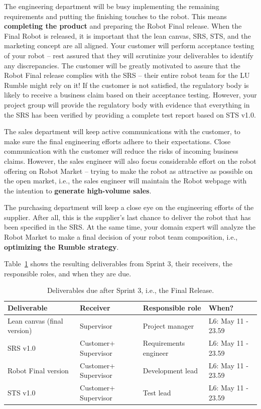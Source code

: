 \documentclass{scrreprt}
\begin{document}
The engineering department will be busy implementing the remaining requirements and putting the finishing touches to the robot. This means \textbf{completing the product} and preparing the Robot Final release. When the Final Robot is released, it is important that the lean canvas, SRS, STS, and the marketing concept are all aligned. Your customer will perform acceptance testing of your robot -- rest assured that they will scrutinize your deliverables to identify any discrepancies. The customer will be greatly motivated to assure that the Robot Final release complies with the SRS -- their entire robot team for the LU Rumble might rely on it! If the customer is not satisfied, the regulatory body is likely to receive a business claim based on their acceptance testing. However, your project group will provide the regulatory body with evidence that everything in the SRS has been verified by providing a complete test report based on STS v1.0.
 
The sales department will keep active communications with the customer, to make sure the final engineering efforts adhere to their expectations. Close communication with the customer will reduce the risks of incoming business claims. However, the sales engineer will also focus considerable effort on the robot offering on Robot Market -- trying to make the robot as attractive as possible on the open market, i.e., the sales engineer will maintain the Robot webpage with the intention to \textbf{generate high-volume sales}.

The purchasing department will keep a close eye on the engineering efforts of the supplier. After all, this is the supplier's last chance to deliver the robot that has been specified in the SRS. At the same time, your domain expert will analyze the Robot Market to make a final decision of your robot team composition, i.e., \textbf{optimizing the Rumble strategy}. 

Table~\ref{tab:sprint3} shows the resulting deliverables from Sprint 3, their receivers, the responsible roles, and when they are due.

\begin{table}[]
\centering
\caption{Deliverables due after Sprint 3, i.e., the Final Release.}
\label{tab:sprint3}
\begin{tabular}{|p{4cm}|p{2cm}|p{2.5cm}|p{4.5cm}|}
\hline
\textbf{Deliverable}           & \textbf{Receiver}   & \textbf{Responsible role} & \textbf{When?}     \\ \hline
Lean canvas (final version)   & Supervisor          & Project manager           & L6: May 11 - 23.59 \\ \hline
SRS v1.0                       & Customer+ Supervisor & Requirements engineer     & L6: May 11 - 23.59 \\ \hline
Robot Final version        & Customer+ Supervisor & Development lead          & L6: May 11 - 23.59  \\ \hline
STS v1.0        			   & Customer+ Supervisor & Test lead                 & L6: May 11 - 23.59  \\ \hline
\end{tabular}
\end{table}
\end{document}
